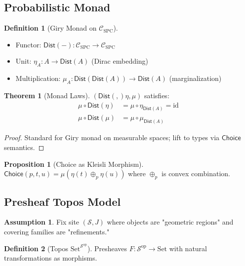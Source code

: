 \documentclass[12pt]{article}
\newcommand{\Choice}{\mathsf{Choice}}
\newcommand{\Dist}[1]{\mathsf{Dist}(#1)}
\theoremstyle{definition}
\newtheorem{definition}{Definition}
\newtheorem{theorem}{Theorem}
\newtheorem{proposition}{Proposition}
\newtheorem{assumption}{Assumption}
\begin{document}
\subsection{Probabilistic Monad}
\begin{definition}[Giry Monad on $\mathcal{C}_{\text{SPC}}$]
\begin{itemize}
\item Functor: $\Dist{-} : \mathcal{C}_{\text{SPC}} \to \mathcal{C}_{\text{SPC}}$
\item Unit: $\eta_A : A \to \Dist{A}$ (Dirac embedding)
\item Multiplication: $\mu_A : \Dist{\Dist{A}} \to \Dist{A}$ (marginalization)
\end{itemize}
\end{definition}

\begin{theorem}[Monad Laws]
$(\Dist, \eta, \mu)$ satisfies:
\begin{align*}
\mu \circ \Dist{\eta} &= \mu \circ \eta_{\Dist{A}} = \text{id} \\
\mu \circ \Dist{\mu} &= \mu \circ \mu_{\Dist{A}}
\end{align*}
\end{theorem}
\begin{proof}
Standard for Giry monad on measurable spaces; lift to types via $\Choice$ semantics.
\end{proof}

\begin{proposition}[Choice as Kleisli Morphism]
$\Choice(p,t,u) = \mu(\eta(t) \oplus_p \eta(u))$ where $\oplus_p$ is convex combination.
\end{proposition}

\subsection{Presheaf Topos Model}
\begin{assumption}
Fix site $(\mathcal{S}, J)$ where objects are "geometric regions" and covering families are "refinements."
\end{assumption}

\begin{definition}[Topos $\text{Set}^{\mathcal{S}^{\text{op}}}$]
Presheaves $F : \mathcal{S}^{\text{op}} \to \text{Set}$ with natural transformations as morphisms.
\end{definition}
\end{document}
